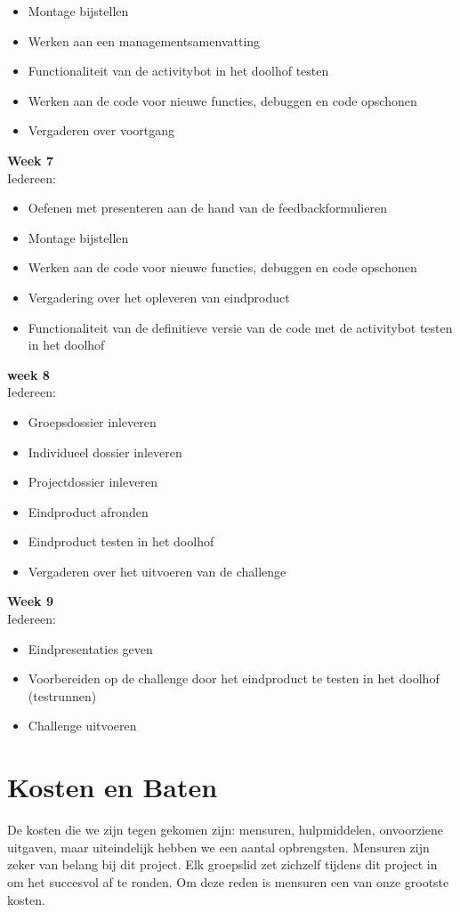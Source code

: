 \documentclass[oneside]{book}
\begin{document}
\begin{itemize}
\item Montage bijstellen
\item Werken aan een managementsamenvatting
\item Functionaliteit van de activitybot in het doolhof testen
\item Werken aan de code voor nieuwe functies, debuggen en code opschonen
\item Vergaderen over voortgang 
\end{itemize}
{\large \textbf{Week 7}}\\
Iedereen:\\
\begin{itemize}
\item Oefenen met presenteren aan de hand van de feedbackformulieren
\item Montage bijstellen
\item Werken aan de code voor nieuwe functies, debuggen en code opschonen
\item Vergadering over het opleveren van eindproduct 
\item Functionaliteit van de definitieve versie van de code met de activitybot testen in het doolhof
\end{itemize}
{\large \textbf{week 8}}\\
Iedereen:\\
\begin{itemize}
\item Groepsdossier inleveren
\item Individueel dossier inleveren
\item Projectdossier inleveren
\item Eindproduct afronden
\item Eindproduct testen in het doolhof
\item Vergaderen over het uitvoeren van de challenge
\end{itemize}
{\large \textbf{Week 9}}\\
Iedereen:\\
\begin{itemize}
\item Eindpresentaties geven
\item Voorbereiden op de challenge door het eindproduct te testen in het doolhof (testrunnen)
\item Challenge uitvoeren
\end{itemize}

\clearpage
\chapter{Kosten en Baten}
De kosten die we zijn tegen gekomen zijn: mensuren, hulpmiddelen, onvoorziene uitgaven, maar uiteindelijk hebben we een aantal opbrengsten.
Mensuren zijn zeker van belang bij dit project. Elk groepslid zet zichzelf tijdens dit project in om het succesvol af te ronden. Om deze reden is mensuren een van onze grootste kosten. \\
\end{document}
